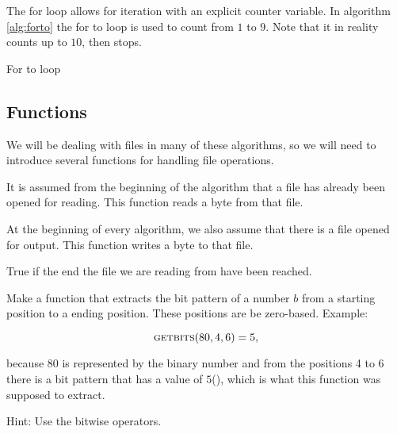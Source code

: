 The for loop allows for iteration with an explicit counter
variable. In algorithm \ref{alg:forto} the for to loop is used to
count from $1$ to $9$. Note that it in reality counts up to $10$, then
stops.

\begin{algorithm}
  \caption{For to loop}\algohack{}
  \label{alg:forto}
  \begin{algorithmic}[1]
    \EndFor
  \end{algorithmic}
\end{algorithm}

\subsection{Functions}
\label{sec:pseudocode}

We will be dealing with files in many of these algorithms, so we will need
to introduce several functions for handling file operations.

\begin{description}[font=\normalfont]
\item[\VoidCall{ReadByte}] It is assumed from the beginning of the
  algorithm that a file has already been opened for reading. This
  function reads a byte from that file.

\item[\Call{WriteByte}{$\var{byte}$}] At the beginning of every algorithm,
  we also assume that there is a file opened for output. This function
  writes a byte to that file.

\item[\VoidCall{EndOfFileReached}] True if the end the file we are
  reading from have been reached.

\end{description}

\begin{Exercise}[label={getbits}]

  Make a function  that
  extracts the bit pattern of a number $b$ from a starting position to
  a ending position. These positions are be zero-based. Example:

  \begin{equation*}
    \Call{getbits}{80, 4, 6}=5,
  \end{equation*}

  because $80$ is represented
  by the binary number  and from the positions 4 to 6
  there is a bit pattern that has a value of $5$(), which is
  what this function was supposed to extract.

  Hint: Use the bitwise operators.

\end{Exercise}

